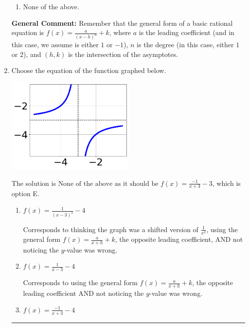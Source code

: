\documentclass{extbook}[14pt]
\newcommand{\litem}[1]{\item #1

\rule{\textwidth}{0.4pt}}
\begin{document}
\begin{enumerate}
{\begin{enumerate}[label=\Alph*.]
\item None of the above.\end{enumerate}
\textbf{General Comment:} Remember that the general form of a basic rational equation is $ f(x) = \frac{a}{(x-h)^n} + k$, where $a$ is the leading coefficient (and in this case, we assume is either $1$ or $-1$), $n$ is the degree (in this case, either $1$ or $2$), and $(h, k)$ is the intersection of the asymptotes.
}
\litem{
Choose the equation of the function graphed below.

\begin{center}
    \includegraphics[width=0.5\textwidth]{../Figures/rationalGraphToEquationB.png}
\end{center}


The solution is \( \text{None of the above as it should be } f(x) = \frac{-1}{x + 3} - 3 \), which is option E.\begin{enumerate}[label=\Alph*.]
\item \( f(x) = \frac{1}{(x - 3)^2} - 4 \)

Corresponds to thinking the graph was a shifted version of $\frac{1}{x^2}$, using the general form $f(x) = \frac{a}{x+h}+k$, the opposite leading coefficient, AND not noticing the $y$-value was wrong.
\item \( f(x) = \frac{1}{x - 3} - 4 \)

Corresponds to using the general form $f(x) = \frac{a}{x+h}+k$, the opposite leading coefficient AND not noticing the $y$-value was wrong.
\item \( f(x) = \frac{-1}{x + 3} - 4 \)


\end{enumerate}}
\end{enumerate}
\end{document}
